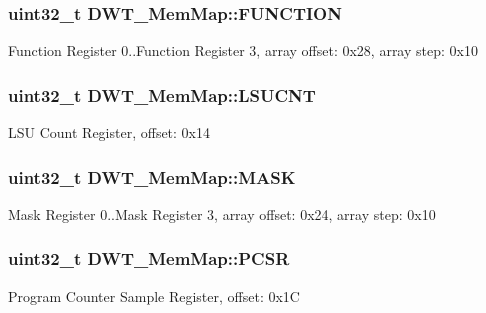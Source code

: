 \subsubsection[{F\+U\+N\+C\+T\+I\+O\+N}]{\setlength{\rightskip}{0pt plus 5cm}uint32\+\_\+t D\+W\+T\+\_\+\+Mem\+Map\+::\+F\+U\+N\+C\+T\+I\+O\+N}\label{struct_d_w_t___mem_map_ad60c09cefe311e7809d9a57fad402f5c}
Function Register 0..Function Register 3, array offset\+: 0x28, array step\+: 0x10 \hypertarget{struct_d_w_t___mem_map_a748bc2765a5d7f9813e099dcfdf55980}{}
\subsubsection[{L\+S\+U\+C\+N\+T}]{\setlength{\rightskip}{0pt plus 5cm}uint32\+\_\+t D\+W\+T\+\_\+\+Mem\+Map\+::\+L\+S\+U\+C\+N\+T}\label{struct_d_w_t___mem_map_a748bc2765a5d7f9813e099dcfdf55980}
L\+S\+U Count Register, offset\+: 0x14 \hypertarget{struct_d_w_t___mem_map_a34e5e25a9ec81fc61eca09c6d6adadfa}{}
\subsubsection[{M\+A\+S\+K}]{\setlength{\rightskip}{0pt plus 5cm}uint32\+\_\+t D\+W\+T\+\_\+\+Mem\+Map\+::\+M\+A\+S\+K}\label{struct_d_w_t___mem_map_a34e5e25a9ec81fc61eca09c6d6adadfa}
Mask Register 0..Mask Register 3, array offset\+: 0x24, array step\+: 0x10 \hypertarget{struct_d_w_t___mem_map_a58d461cd26674ff3bce87778c4b54164}{}
\subsubsection[{P\+C\+S\+R}]{\setlength{\rightskip}{0pt plus 5cm}uint32\+\_\+t D\+W\+T\+\_\+\+Mem\+Map\+::\+P\+C\+S\+R}\label{struct_d_w_t___mem_map_a58d461cd26674ff3bce87778c4b54164}
Program Counter Sample Register, offset\+: 0x1\+C \hypertarget{struct_d_w_t___mem_map_a822de5f73ae889eaedbe7ae65428b786}{}
